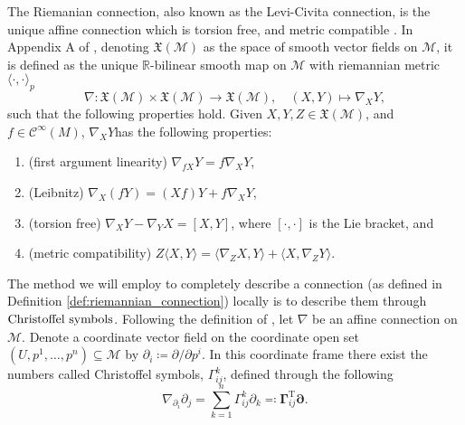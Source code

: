 \begin{definition}\label{def:riemannian_connection}
    The \textup{Riemanian connection}, also known as the \textup{Levi-Civita connection}, is the unique affine connection which is torsion free, and metric compatible \cite[Def.~6.4]{Tu2017}. In Appendix A of \cite{JensenZimmermann2024}, denoting $\mathfrak{X}(\mathcal{M})$ as the space of smooth vector fields on $\mathcal{M}$, it is defined as the unique $\mathbb{R}$-bilinear smooth map on $\mathcal{M}$ with riemannian metric $\langle \cdot, \cdot\rangle_{p}$
    \begin{equation*}
        \nabla\colon \mathfrak{X}(\mathcal{M})\times \mathfrak{X}(\mathcal{M})\xrightarrow{}\mathfrak{X}(\mathcal{M}),\quad (X,Y)\mapsto \nabla_{X}Y,
    \end{equation*}
    such that the following properties hold. Given $X,Y,Z\in \mathfrak{X}(\mathcal{M})$, and $f\in \mathcal{C}^{\infty}(M)$, $\nabla_{X}Y$has the following properties:
    \begin{enumerate}
        \item (first argument linearity) $\nabla_{fX}Y=f \nabla_{X}Y$, 
        \item {}(Leibnitz) $\nabla_{X}(fY)=(Xf)Y+f \nabla_{X}Y$, 
        \item (torsion free) $\nabla_{X}Y-\nabla_{Y}X=[X,Y]$, where $[\cdot,\cdot]$ is the Lie bracket, and
        \item (metric compatibility) $Z \langle X,Y\rangle=\langle \nabla_{Z}X,Y\rangle+\langle X,\nabla_{Z}Y\rangle$.
    \end{enumerate}
\end{definition}

\begin{definition}\label{def:christoffel_symbols}
    The method we will employ to completely describe a connection (as defined in Definition \ref{def:riemannian_connection}) locally is to describe them through $\textup{Christoffel symbols}$. Following the definition of \cite[p.~100]{Tu2017}, let $\nabla$ be an affine connection on $\mathcal{M}$. Denote a coordinate vector field on the coordinate open set $(U,p^{1},\dots,p^{n})\subseteq\mathcal{M}$ by $\partial_{i}\coloneqq \partial/\partial p^i$. In this coordinate frame there exist the numbers called Christoffel symbols, $\Gamma_{ij}^{k}$, defined through the following
    \begin{equation*}
        \nabla_{\partial_{i}}\partial_{j}=\sum\limits_{k=1}^{n}\Gamma_{ij}^{k}\partial_{k}\eqqcolon\mathbf{\Gamma}_{ij}^{\mathrm{T}}\mathbf{\partial}.    
    \end{equation*}
\end{definition}

